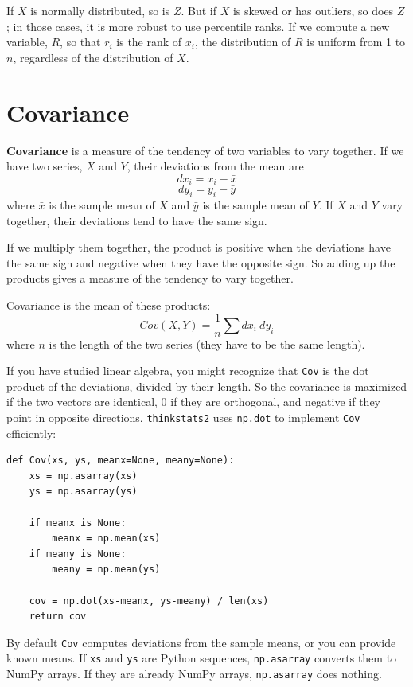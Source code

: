 \documentclass[12pt]{book}
\newcommand{\xbar}{\bar{x}}
\newcommand{\ybar}{\bar{y}}
\theoremstyle{exercise}
\begin{document}
If $X$ is normally distributed, so is $Z$.  But if $X$ is skewed or has
outliers, so does $Z$; in those cases, it is more robust to use
percentile ranks.  If we compute a new variable, $R$, so that $r_i$ is
the rank of $x_i$, the distribution of $R$ is uniform
from 1 to $n$, regardless of the distribution of $X$.%
%
%
%
%


\section{Covariance}%
%

{\bf Covariance} is a measure of the tendency of two variables
to vary together.  If we have two series, $X$ and $Y$, their
deviations from the mean are
%
\[ dx_i = x_i - \xbar \]
\[ dy_i = y_i - \ybar \]
%
where $\xbar$ is the sample mean of $X$ and $\ybar$ is the sample mean
of $Y$.  If $X$ and $Y$ vary together, their deviations tend to have
the same sign.

If we multiply them together, the product is positive when the
deviations have the same sign and negative when they have the opposite
sign.  So adding up the products gives a measure of the tendency to
vary together.

Covariance is the mean of these products:
%
\[ Cov(X,Y) = \frac{1}{n} \sum dx_i~dy_i \]
%
where $n$ is the length of the two series (they have to be the same
length).

If you have studied linear algebra, you might recognize that
{\tt Cov} is the dot product of the deviations, divided
by their length.  So the covariance is maximized if the two vectors
are identical, 0 if they are orthogonal, and negative if they
point in opposite directions.  {\tt thinkstats2} uses {\tt np.dot} to
implement {\tt Cov} efficiently:%
%
%

\begin{verbatim}
def Cov(xs, ys, meanx=None, meany=None):
    xs = np.asarray(xs)
    ys = np.asarray(ys)

    if meanx is None:
        meanx = np.mean(xs)
    if meany is None:
        meany = np.mean(ys)

    cov = np.dot(xs-meanx, ys-meany) / len(xs)
    return cov
\end{verbatim}

By default {\tt Cov} computes deviations from the sample means,
or you can provide known means.  If {\tt xs} and {\tt ys} are
Python sequences, {\tt np.asarray} converts them to NumPy arrays.
If they are already NumPy arrays, {\tt np.asarray} does nothing.%
\end{document}
